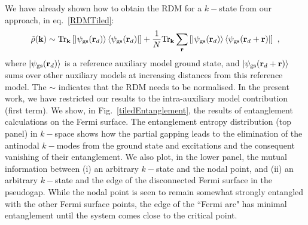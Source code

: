 \documentclass[reprint,hidelinks,onecolumn]{revtex4-2}
\begin{document}
We have already shown how to obtain the RDM for a \(k-\)state from our approach, in eq.~\ref{RDMTiled}:
\begin{equation}\begin{aligned}
	\tilde \rho({\bf k}) \sim \text{Tr}_{\bf k}\left[\ket{\psi_\text{gs}({\bf r}_d)}\bra{\psi_\text{gs}({\bf r}_d)}\right] + \frac{1}{N}\text{Tr}_{\bf k}\sum_{{\bf r}}\left[\ket{\psi_\text{gs}({\bf r}_d)}\bra{\psi_\text{gs}({\bf r}_d + {\bf r})}\right]~,
\end{aligned}\end{equation}
where \(\ket{\psi_\text{gs}({\bf r}_d)}\) is a reference auxiliary model ground state, and \(\ket{\psi_\text{gs}({\bf r}_d + {\bf r})}\) sums over other auxiliary models at increasing distances from this reference model. The \(\sim\) indicates that the RDM needs to be normalised. In the present work, we have restricted our results to the intra-auxiliary model contribution (first term). We show, in Fig.~\ref{tiledEntanglement}, the results of entanglement calculations on the Fermi surface. The entanglement entropy distribution (top panel) in \(k-\)space shows how the partial gapping leads to the elimination of the antinodal \(k-\)modes from the ground state and excitations and the consequent vanishing of their entanglement. We also plot, in the lower panel, the mutual information between (i) an arbitrary \(k-\)state and the nodal point, and (ii) an arbitrary \(k-\)state and the edge of the disconnected Fermi surface in the pseudogap. While the nodal point is seen to remain somewhat strongly entangled with the other Fermi surface points, the edge of the ``Fermi arc" has minimal entanglement until the system comes close to the critical point.
\end{document}
